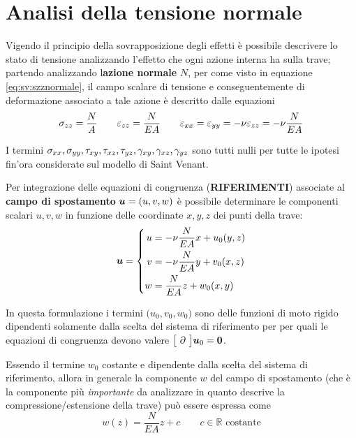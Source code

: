 \section{Analisi della tensione normale} \label{sec:sv:normale}
	Vigendo il principio della sovrapposizione degli effetti è possibile descrivere lo stato di tensione analizzando l'effetto che ogni azione interna ha sulla trave; partendo analizzando l\textbf{azione normale} $N$, per come visto in equazione \ref{eq:sv:szznormale}, il campo scalare di tensione e conseguentemente di deformazione associato a tale azione è descritto dalle equazioni
	\[ \sigma_{zz} = \frac NA  \qquad \varepsilon_{zz} = \frac N {EA} \qquad \varepsilon_{xx} = \varepsilon_{yy} = -\nu \varepsilon_{zz} = -\nu \frac N{EA} \]  
	\begin{osservazione}
		I termini $\sigma_{xx}, \sigma_{yy}, \tau_{xy},\tau_{xz},\tau_{yz}, \gamma_{xy},\gamma_{xz}, \gamma_{yz}$ sono tutti nulli per tutte le ipotesi fin'ora considerate sul modello di Saint Venant.
	\end{osservazione}
	\begin{concetto}		
		Per integrazione delle equazioni di congruenza (\textbf{RIFERIMENTI}) associate al \textbf{campo di spostamento} $\boldsymbol{u} = (u,v,w)$ è possibile determinare le componenti scalari $u,v,w$ in funzione delle coordinate $x,y,z$ dei punti della trave:
		\begin{equation}\label{eq:sv:camponormale}
			\boldsymbol{u} = \left\{ \begin{split}
				u &= -\nu \frac N {EA} x + u_0(y,z) \\
				v &= -\nu \frac N {EA} y + v_0(x,z) \\
				w &= \frac N {EA} z + w_0(x,y) \\
			\end{split} \right.
		\end{equation}
	\end{concetto}
	In questa formulazione i termini $\big(u_0,v_0,w_0\big)$ sono delle funzioni di moto rigido dipendenti solamente dalla scelta del sistema di riferimento per per quali le equazioni di congruenza devono valere $\big[ \ \partial \ \big] \boldsymbol{u}_0 = \boldsymbol{0}$.
	\begin{osservazione}
		Essendo il termine $w_0$ costante e dipendente dalla scelta del sistema di riferimento, allora in generale la componente $w$ del campo di spostamento (che è la componente più \textit{importante} da analizzare in quanto descrive la compressione/estensione della trave) può essere espressa come
		\begin{equation} \label{eq:sv:wnormale}
			 w(z) = \frac N{EA}z + c \qquad c \in \mathds R \textrm{ costante}
		\end{equation}
	\end{osservazione}
